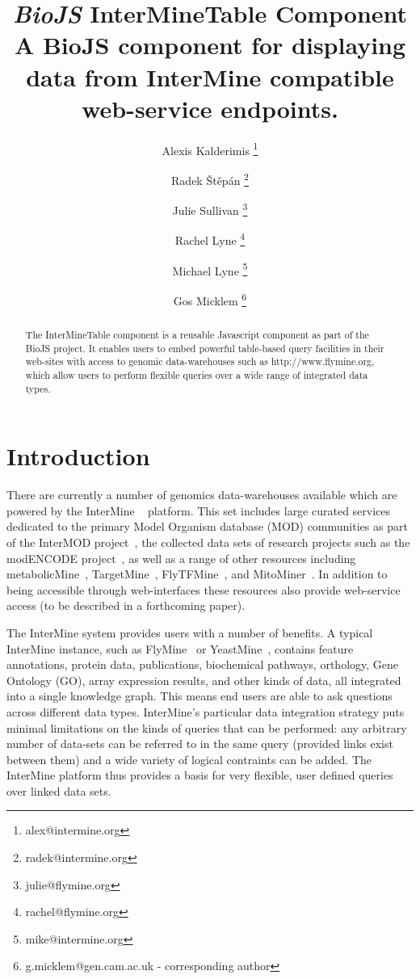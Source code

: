 \documentclass[10pt,a4paper,twocolumn]{article}
\begin{document}
\title{\textit{BioJS} InterMineTable Component \\
\small{A BioJS component for displaying data from InterMine compatible web-service endpoints.}
}
\author[1]{Alexis Kalderimis \thanks{alex@intermine.org}}
\author[1]{Radek Štěpán \thanks{radek@intermine.org}}
\author[1]{Julie Sullivan \thanks{julie@flymine.org}}
\author[1]{Rachel Lyne \thanks{rachel@flymine.org}}
\author[1]{Michael Lyne \thanks{mike@intermine.org}}
\author[1]{Gos Micklem \thanks{g.micklem@gen.cam.ac.uk - corresponding author}}

\maketitle
\thispagestyle{fancy}

\begin{abstract}

The InterMineTable component is a reusable Javascript
component as part of the BioJS project. It enables users to embed
powerful table-based query facilities in their web-sites with
access to genomic data-warehouses such as http://www.flymine.org,
which allow users to perform flexible queries over a wide range
of integrated data types.

\end{abstract}
\clearpage

\section*{Introduction}

There are currently a number of genomics data-warehouses available which are
powered by the InterMine ~\cite{smith2012} platform. This set includes large
curated services dedicated to the primary Model Organism database (MOD)
communities as part of the InterMOD project~\cite{sullivan2013}, the collected
data sets of research projects such as the modENCODE
project~\cite{contrino2012}, as well as a range of other resources including
metabolicMine~\cite{metabolicmine}, TargetMine~\cite{targetmine},
FlyTFMine~\cite{flytfmine}, and MitoMiner~\cite{mitominer}.  In addition to
being accessible through web-interfaces these resources also provide web-service
access (to be described in a forthcoming paper).

The InterMine system provides users with a number of benefits. A typical
InterMine instance, such as FlyMine~\cite{flymine} or
YeastMine~\cite{yeastmine}, contains feature annotations, protein data,
publications, biochemical pathways, orthology, Gene Ontology (GO), array
expression results, and other kinds of data, all integrated into a single
knowledge graph. This means end users are able to ask questions across different
data types. InterMine's particular data integration strategy puts minimal
limitations on the kinds of queries that can be performed: any arbitrary number
of data-sets can be referred to in the same query (provided links exist between
them) and a wide variety of logical contraints can be added. The InterMine
platform thus provides a basis for very flexible, user defined
queries over linked data sets. 
\end{document}
